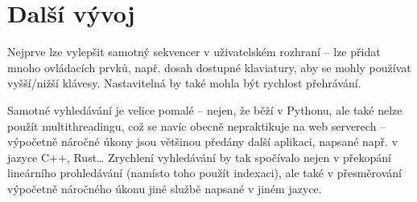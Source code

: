 \section{Další vývoj}
Nejprve lze vylepšit samotný sekvencer v uživatelském rozhraní -- lze přidat mnoho ovládacích prvků, např. dosah dostupné klaviatury, aby se mohly používat vyšší/nižší klávesy. Nastavitelná by také mohla být rychlost přehrávání.

Samotné vyhledávání je velice pomalé -- nejen, že běží v Pythonu, ale také nelze použít multithreadingu, což se navíc obecně nepraktikuje na web serverech -- výpočetně náročné úkony jsou většinou předány další aplikaci, napsané např. v jazyce C++, Rust\ldots{ }Zrychlení vyhledávání by tak spočívalo nejen v překopání lineárního prohledávání (namísto toho použít indexaci), ale také v přesměrování výpočetně náročného úkonu jiné službě napsané v jiném jazyce.
\pagebreak